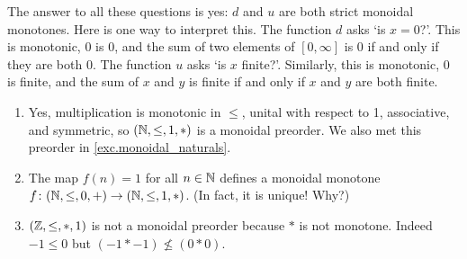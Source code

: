 \documentclass[7Sketches]{subfiles}
\begin{document}
{
The answer to all these questions is yes: $d$ and $u$ are both strict monoidal
monotones. Here is one way to interpret this. The function $d$ asks `is $x=0$?'.
This is monotonic, $0$ is $0$, and the sum of two elements of $[0,\infty]$ is
$0$ if and only if they are both $0$. The function $u$ asks `is $x$ finite?'.
Similarly, this is monotonic, $0$ is finite, and the sum of $x$ and $y$ is
finite if and only if $x$ and $y$ are both finite.
}

{
\begin{enumerate}
	\item Yes, multiplication is monotonic in $\leq$, unital with respect
	  to 1, associative, and symmetric, so $(\mathbb{N},\leq,1,*)$ is a monoidal
	  preorder. We also met this preorder in \cref{exc.monoidal_naturals}.
	\item The map $f(n) =1$ for all $n \in \mathbb{N}$ defines a monoidal monotone
	$f\colon(\mathbb{N},\leq,0,+)\to(\mathbb{N},\leq,1,*)$. (In fact, it is unique! Why?)
	\item $(\mathbb{Z},\leq,*,1)$ is not a monoidal preorder because $*$ is not monotone. Indeed $-1\leq 0$ but $(-1*-1)\not\leq (0*0)$.
\end{enumerate}
}
\end{document}
